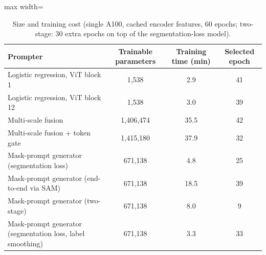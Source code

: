 \begin{table}[htbp]
\centering
\small
\begin{adjustbox}{max width=\linewidth}
\begin{tabular}{lccc}
\toprule
Prompter & Trainable parameters & Training time (min) & Selected epoch \\
\midrule
Logistic regression, ViT block 1 & 1,538 & 2.9 & 41 \\
Logistic regression, ViT block 12 & 1,538 & 3.0 & 39 \\
Multi-scale fusion & 1,406,474 & 35.5 & 42 \\
Multi-scale fusion + token gate & 1,415,180 & 37.9 & 32 \\
Mask-prompt generator (segmentation loss) & 671,138 & 4.8 & 25 \\
Mask-prompt generator (end-to-end via SAM) & 671,138 & 18.5 & 39 \\
Mask-prompt generator (two-stage) & 671,138 & 8.0 & 9 \\
Mask-prompt generator (segmentation loss, label smoothing) & 671,138 & 3.3 & 33 \\
\bottomrule
\end{tabular}
\end{adjustbox}
\caption{Size and training cost (single A100, cached encoder features, 60 epochs; two-stage: 30 extra epochs on top of the segmentation-loss model).}
\label{tab:cost_infused_mlp05}
\end{table}
